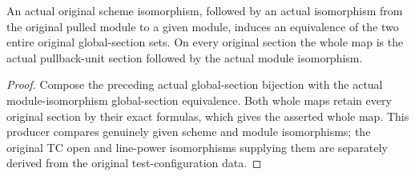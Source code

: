 \begin{theorem}\label{thm:actual-scheme-module-iso-global-sections}
\leanok
An actual original scheme isomorphism, followed by an actual
isomorphism from the original pulled module to a given module,
induces an equivalence of the two entire original global-section
sets. On every original section the whole map is the actual
pullback-unit section followed by the actual module isomorphism.
\end{theorem}
\begin{proof}
Compose the preceding actual global-section bijection with the
actual module-isomorphism global-section equivalence. Both whole
maps retain every original section by their exact formulas, which
gives the asserted whole map. This producer compares genuinely
given scheme and module isomorphisms; the original TC open and
line-power isomorphisms supplying them are separately derived
from the original test-configuration data.
\end{proof}
